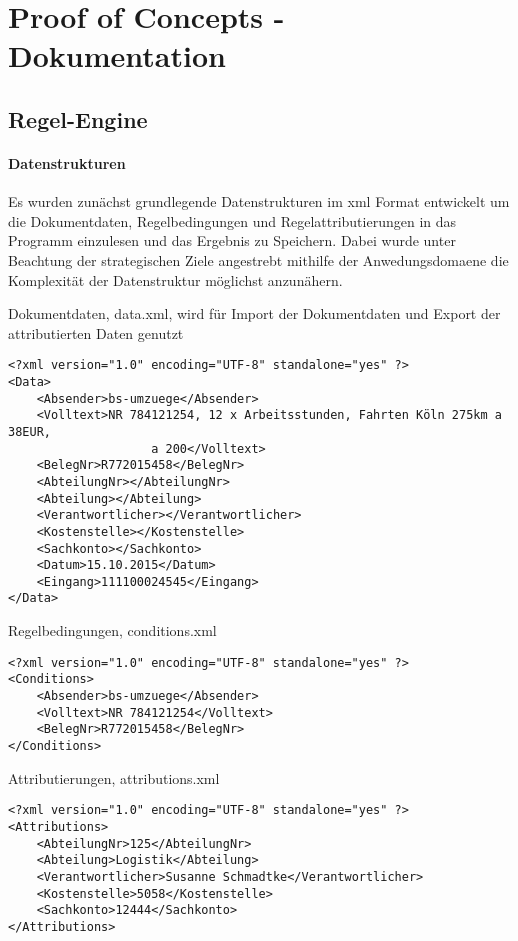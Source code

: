 \documentclass[11pt,oneside,a4paper,notitlepage]{article}
\begin{document}
%
\section{Proof of Concepts - Dokumentation}
%
\subsection{Regel-Engine}

\paragraph*{Datenstrukturen}
Es wurden zunächst grundlegende Datenstrukturen im xml Format entwickelt um die Dokumentdaten, Regelbedingungen und Regelattributierungen in das Programm einzulesen und das Ergebnis zu Speichern. Dabei wurde unter Beachtung der strategischen Ziele angestrebt mithilfe der Anwedungsdomaene die Komplexität der Datenstruktur möglichst anzunähern.

Dokumentdaten, data.xml, wird für Import der Dokumentdaten und Export der attributierten Daten genutzt\\
\begin{verbatim}
<?xml version="1.0" encoding="UTF-8" standalone="yes" ?>
<Data>
    <Absender>bs-umzuege</Absender>
    <Volltext>NR 784121254, 12 x Arbeitsstunden, Fahrten Köln 275km a 38EUR, 
    				a 200</Volltext>
    <BelegNr>R772015458</BelegNr>
    <AbteilungNr></AbteilungNr>
    <Abteilung></Abteilung>
    <Verantwortlicher></Verantwortlicher>
    <Kostenstelle></Kostenstelle>
    <Sachkonto></Sachkonto>
    <Datum>15.10.2015</Datum>
    <Eingang>111100024545</Eingang>
</Data>
\end{verbatim}

Regelbedingungen, conditions.xml
\begin{verbatim}
<?xml version="1.0" encoding="UTF-8" standalone="yes" ?>
<Conditions>
    <Absender>bs-umzuege</Absender>
    <Volltext>NR 784121254</Volltext>
    <BelegNr>R772015458</BelegNr>
</Conditions>
\end{verbatim}

Attributierungen, attributions.xml
\begin{verbatim}
<?xml version="1.0" encoding="UTF-8" standalone="yes" ?>
<Attributions>
    <AbteilungNr>125</AbteilungNr>
    <Abteilung>Logistik</Abteilung>
    <Verantwortlicher>Susanne Schmadtke</Verantwortlicher>
    <Kostenstelle>5058</Kostenstelle>
    <Sachkonto>12444</Sachkonto>
</Attributions>
\end{verbatim}
\end{document}
